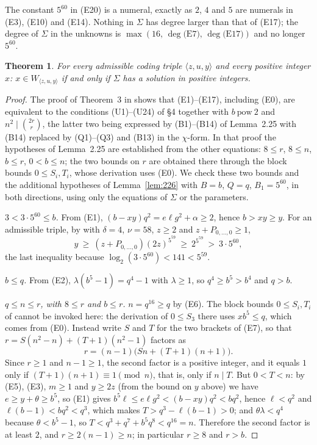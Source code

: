 \documentclass[11pt,letterpaper]{article}
\newtheorem{theorem}{Theorem}[section]
\theoremstyle{definition}
\theoremstyle{remark}
\numberwithin{equation}{section}
\newcommand{\pow}{\ \mathrm{pow}\ }
\begin{document}
The constant $5^{60}$ in (E20) is a numeral, exactly as $2$, $4$ and $5$ are
numerals in (E3), (E10) and (E14). Nothing in $\Sigma$ has degree larger than
that of (E17); the degree of $\Sigma$ in the unknowns is $\max(16,\,\deg
\text{(E7)},\,\deg\text{(E17)})$ and no longer $5^{60}$.

\begin{theorem}\label{thm:sigma}
For every admissible coding triple $\langle z,u,y\rangle$ and every positive
integer $x$: $x\in W_{\langle z,u,y\rangle}$ if and only if $\Sigma$ has a
solution in positive integers.
\end{theorem}

\begin{proof}
The proof of Theorem~3 in \cite[\S4]{J82} shows that (E1)--(E17), including
(E0), are equivalent to the conditions (U1)--(U24) of \S4 together with
$b\pow2$ and $n^2\mid\binom{2r}{r}$, the latter two being expressed by
(B1)--(B14) of Lemma~2.25 with (B14) replaced by (Q1)--(Q3) and (B13) in the
$\chi$-form. In that proof the hypotheses of Lemma~2.25 are established from
the other equations: $8\le r$, $8\le n$, $b\le r$, $0<b\le n$; the two bounds
on $r$ are obtained there through the block bounds $0\le S_i,T_i$, whose
derivation uses (E0). We check these two bounds and the additional
hypotheses of Lemma~\ref{lem:226} with $B=b$, $Q=q$, $B_1=5^{60}$, in both
directions, using only the equations of $\Sigma$ or the parameters.

\emph{$3<3\cdot5^{60}\le b$.} From (E1), $(b-xy)q^2=e\ell g^2+\alpha\ge2$,
hence $b>xy\ge y$. For an admissible triple, by \cite[(4.1)]{J82} with
$\delta=4$, $\nu=58$, $z\ge2$ and $z+P_{0,\dots,0}\ge1$,
\[
 y\ \ge\ (z+P_{0,\dots,0})(2z)^{5^{59}}\ \ge\ 2^{5^{59}}\ >\ 3\cdot5^{60},
\]
the last inequality because $\log_2(3\cdot5^{60})<141<5^{59}$.

\emph{$b\le q$.} From (E2), $\lambda(b^5-1)=q^4-1$ with $\lambda\ge1$, so
$q^4\ge b^5>b^4$ and $q>b$.

\emph{$q\le n\le r$, with $8\le r$ and $b\le r$.} $n=q^{16}\ge q$ by (E6). The
block bounds $0\le S_i,T_i$ of \cite[\S4]{J82} cannot be invoked here: the
derivation of $0\le S_3$ there uses $xb^5\le q$, which comes from (E0).
Instead write $S$ and $T$ for the two brackets of (E7), so that
$r=S(n^2-n)+(T+1)(n^2-1)$ factors as
\[
 r=(n-1)\bigl(Sn+(T+1)(n+1)\bigr).
\]
Since $r\ge1$ and $n-1\ge1$, the second factor is a positive integer, and it
equals $1$ only if $(T+1)(n+1)\equiv1\pmod n$, that is, only if $n\mid T$.
But $0<T<n$: by (E5), (E3), $m\ge1$ and $y\ge2z$ (from the bound on $y$
above) we have $e\ge y+\theta\ge b^5$, so (E1) gives
$b^5\ell\le e\ell g^2<(b-xy)q^2<bq^2$, hence $\ell<q^2$ and
$\ell(b-1)<bq^2<q^3$, which makes $T>q^3-\ell(b-1)>0$; and
$\theta\lambda<q^4$ because $\theta<b^5-1$, so
$T<q^3+q^7+b^5q^8<q^{16}=n$. Therefore the second factor is at least $2$,
and $r\ge2(n-1)\ge n$; in particular $r\ge8$ and $r>b$.


\end{proof}
\end{document}
